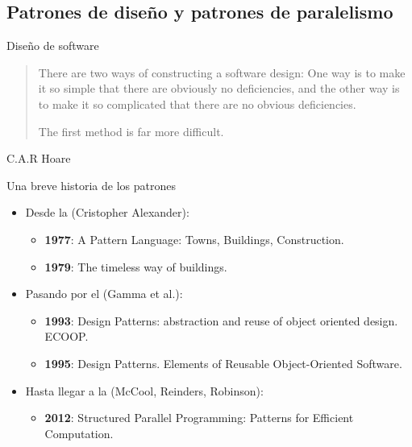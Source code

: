 \subsection{Patrones de diseño y patrones de paralelismo}

\begin{frame}[t]{Diseño de software}

\begin{quote}
There are two ways of constructing a software design: One way is to make it so
simple that there are obviously no deficiencies, and the other way is to make
it so complicated that there are no obvious deficiencies. 

The first method is far more difficult. 
\end{quote}
\hfill C.A.R Hoare
\end{frame}

\begin{frame}[t]{Una breve historia de los patrones}
\begin{itemize}
\item Desde la  (Cristopher Alexander):
\begin{itemize}
  \item \textbf{1977}: A Pattern Language: Towns, Buildings, Construction.
  \item \textbf{1979}: The timeless way of buildings.
\end{itemize}
\vfill\pause
\item Pasando por el  (Gamma et al.):
\begin{itemize}
  \item \textbf{1993}: Design Patterns: abstraction and reuse of object oriented design. ECOOP.
  \item \textbf{1995}: Design Patterns. Elements of Reusable Object-Oriented Software.
\end{itemize}
\vfill\pause
\item Hasta llegar a la  (McCool, Reinders, Robinson):
\begin{itemize}
  \item \textbf{2012}: Structured Parallel Programming: Patterns for Efficient Computation.
\end{itemize}
\end{itemize}
\end{frame}
